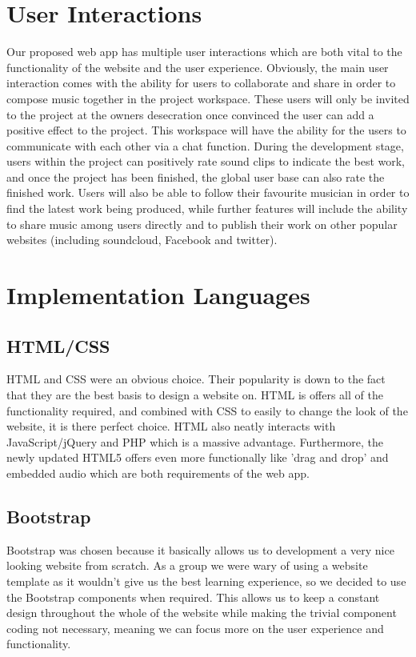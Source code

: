 \documentclass{article}
\begin{document}
\section{User Interactions}
Our proposed web app has multiple user interactions which are both vital to the functionality of the website and the user experience. Obviously, the main user interaction comes with the ability for users to collaborate and share in order to compose music together in the project workspace. These users will only be invited to the project at the owners desecration once convinced the user can add a positive effect to the project. This workspace will have the ability for the users to communicate with each other via a chat function. During the development stage, users within the project can positively rate sound clips to indicate the best work, and once the project has been finished, the global user base can also rate the finished work. Users will also be able to follow their favourite musician in order to find the latest work being produced, while further features will include the ability to share music among users directly and to publish their work on other popular websites (including soundcloud, Facebook and twitter).

\section{Implementation Languages}

\subsection{HTML/CSS}
HTML and CSS were an obvious choice. Their popularity is down to the fact that they are the best basis to design a website on. HTML is offers all of the functionality required, and combined with CSS to easily to change the look of the website, it is there perfect choice. HTML also neatly interacts with JavaScript/jQuery and PHP which is a massive advantage. Furthermore, the newly updated HTML5 offers even more functionally like 'drag and drop' and embedded audio which are both requirements of the web app.

\subsection{Bootstrap}
Bootstrap was chosen because it basically allows us to development a very nice looking website from scratch. As a group we were wary of using a website template as it wouldn't give us the best learning experience, so we decided to use the Bootstrap components when required. This allows us to keep a constant design throughout the whole of the website while making the trivial component coding not necessary, meaning we can focus more on the user experience and functionality.
\end{document}
